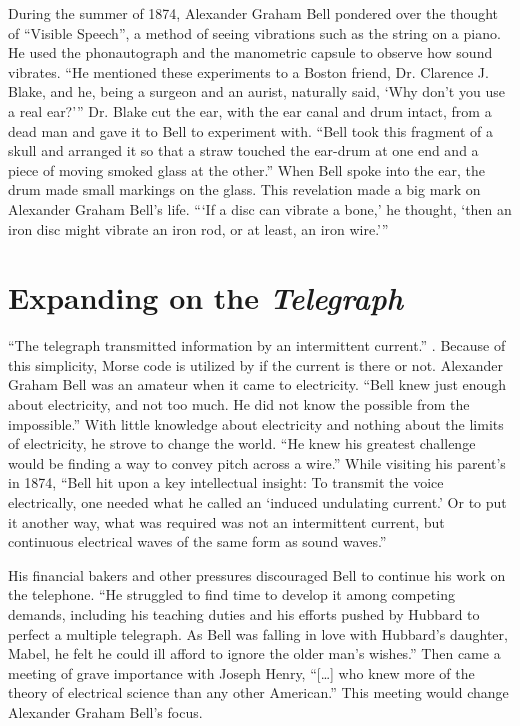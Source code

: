 \documentclass[12pt singlecol]{article}
\begin{document}
\begin{flushleft}
\begin{multicols}{2}
During the summer of 1874, Alexander Graham Bell pondered over the thought of ``Visible Speech'', a method of seeing vibrations such as the string on a piano. He used the phonautograph and the manometric capsule to observe how sound vibrates. ``He mentioned these experiments to a Boston friend, Dr. Clarence J. Blake, and he, being a surgeon and an aurist, naturally said, `Why don't you use a real ear?''' \cite[p.~26]{Casson10} Dr. Blake cut the ear, with the ear canal and drum intact, from a dead man and gave it to Bell to experiment with. ``Bell took this fragment of a skull and arranged it so that a straw touched the ear-drum at one end and a piece of moving smoked glass at the other.'' \cite[p.~26]{Casson10} When Bell spoke into the ear, the drum made small markings on the glass. This revelation made a big mark on Alexander Graham Bell's life. ```If a disc can vibrate a bone,' he thought, `then an iron disc might vibrate an iron rod, or at least, an iron wire.''' \cite[p.~27]{Casson10} 

\section{Expanding on the \emph{Telegraph}}

``The telegraph transmitted information by an intermittent current.'' \cite[para.~7]{ATT13}. Because of this simplicity, Morse code is utilized by if the current is there or not. Alexander Graham Bell was an amateur when it came to electricity. ``Bell knew just enough about electricity, and not too much. He did not know the possible from the impossible.'' \cite[p.~34]{Casson10} With little knowledge about electricity and nothing about the limits of electricity, he strove to change the world. ``He knew his greatest challenge would be finding a way to convey pitch across a wire.'' \cite[para.~4]{MIT00} While visiting his parent's in 1874, ``Bell hit upon a key intellectual insight: To transmit the voice electrically, one needed what he called an `induced undulating current.' Or to put it another way, what was required was not an intermittent current, but continuous electrical waves of the same form as sound waves.'' \cite[para.~7]{ATT13}

His financial bakers and other pressures discouraged Bell to continue his work on the telephone. ``He struggled to find time to develop it among competing demands, including his teaching duties and his efforts \textemdash pushed by Hubbard \textemdash to perfect a multiple telegraph. As Bell was falling in love with Hubbard’s daughter, Mabel, he felt he could ill afford to ignore the older man's wishes.'' Then came a meeting of grave importance with Joseph Henry, ``[\ldots] who knew more of the theory of electrical science than any other American.'' \cite[p.~29]{Casson10} This meeting would change Alexander Graham Bell's focus.


\end{multicols}
\end{flushleft}
\end{document}
